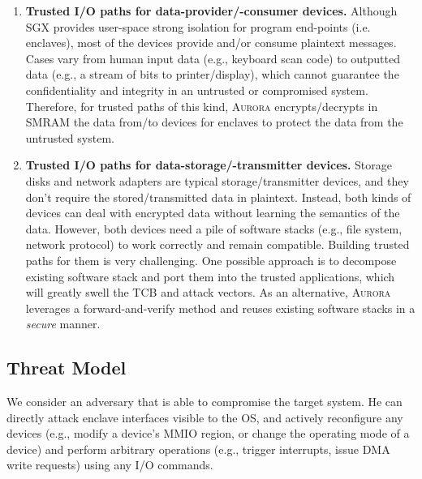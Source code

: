 \begin{enumerate}

\item \textbf{Trusted I/O paths for data-provider/-consumer devices.}
Although SGX provides user-space strong isolation for program end-points (i.e. enclaves), most of the devices provide and/or consume plaintext messages. Cases vary from human input data (e.g., keyboard scan code) to outputted data (e.g., a stream of bits to printer/display), which cannot guarantee the confidentiality and integrity in an untrusted or compromised system. Therefore, for trusted paths of this kind, \textsc{Aurora} encrypts/decrypts in SMRAM the data from/to devices for enclaves to protect the data from the untrusted system.

\item \textbf{Trusted I/O paths for data-storage/-transmitter devices.} Storage disks and network adapters are typical storage/transmitter devices, and they don't require the stored/transmitted data in plaintext. Instead, both kinds of devices can deal with encrypted data without learning the semantics of the data. However, both devices need a pile of software stacks (e.g., file system, network protocol) to work correctly and remain compatible. Building trusted paths for them is very challenging. One possible approach is to decompose existing software stack and port them into the trusted applications, which will greatly swell the TCB and attack vectors. As an alternative, \textsc{Aurora} leverages a forward-and-verify method and reuses existing software stacks in a \emph{secure} manner.

\end{enumerate}

\subsection{Threat Model}
We consider an adversary that is able to compromise the target system. He can directly attack enclave interfaces visible to the OS, and actively reconfigure any devices (e.g., modify a device’s MMIO region, or change the operating mode of a device)
and perform arbitrary operations (e.g., trigger interrupts, issue DMA write requests) using any I/O commands. %

